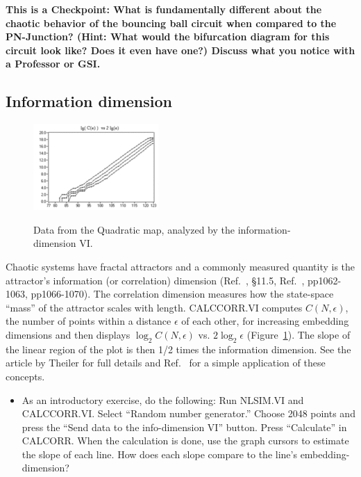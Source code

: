 \documentclass{../lab}
\begin{document}
\textbf{This is a Checkpoint: What is fundamentally different about the chaotic behavior of the bouncing ball circuit when compared to the PN-Junction? (Hint: What would the bifurcation diagram for this circuit look like? Does it even have one?) Discuss what you notice with a Professor or GSI.}

\subsection{Information dimension}

\begin{figure}[h]
    \centering
    \href{http://experimentationlab.berkeley.edu/sites/default/files/images/180px-Nldimage133.gif}{\includegraphics[width=0.5\linewidth]{images/180px-Nldimage133.png}}
    \caption{Data from the Quadratic map, analyzed by the information-dimension VI.}
    \label{fig:DataFromQuadraticMap}
\end{figure}

Chaotic systems have fractal attractors and a commonly measured quantity is the attractor's information (or correlation) dimension (Ref.~\cite{Strogatz}, \S11.5, Ref.~\cite{Theiler}, pp1062-1063, pp1066-1070). The correlation dimension measures how the state-space ``mass'' of the attractor scales with length. CALCCORR.VI computes $C(N,\epsilon)$, the number of points within a distance $\epsilon$ of each other, for increasing embedding dimensions and then displays $\log_2 C(N,\epsilon)$ vs. $2 \log_2 \epsilon$ (Figure~\ref{fig:DataFromQuadraticMap}). The slope of the linear region of the plot is then 1/2 times the information dimension. See the article by Theiler \cite{Theiler} for full details and Ref.~\cite{Buskirk} for a simple application of these concepts.

\begin{itemize}
    \item As an introductory exercise, do the following: Run NLSIM.VI and CALCCORR.VI. Select ``Random number generator.'' Choose 2048 points and press the ``Send data to the info-dimension VI'' button. Press ``Calculate'' in CALCORR. When the calculation is done, use the graph cursors to estimate the slope of each line. How does each slope compare to the line's embedding-dimension?
\end{itemize}
\end{document}
